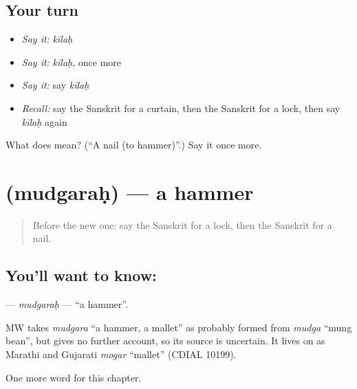 \subsection*{Your turn}
\begin{itemize}
\raggedright
  \item \emph{Say it:} \emph{kīlaḥ}
  \item \emph{Say it:} \emph{kīlaḥ}, once more
  \item \emph{Say it:} say \emph{kīlaḥ}
  \item \emph{Recall:} say the Sanskrit for a curtain, then the Sanskrit for a lock, then say \emph{kīlaḥ} again
\end{itemize}

\begin{tcolorbox}[breakable,colback=teal!4,colframe=teal!35!black,title={Before you move on}]
What does  mean? (\textquotedblleft{}A nail (to hammer)\textquotedblright{}.) Say it once more.
\end{tcolorbox}
\section[\texorpdfstring{\sk{मुद्गरः} (mudgaraḥ)}{मुद्गरः (mudgaraḥ)}]{ (mudgaraḥ) — a hammer}

\label{lesson:SA-C100-mudgarah}



\begin{quote}
Before the new one: say the Sanskrit for a lock, then the Sanskrit for a nail.
\end{quote}

\subsection*{You'll want to know: }
\textbf{} — \emph{mudgaraḥ} — \textquotedblleft{}a hammer\textquotedblright{}.

\begin{cousinweb}
MW takes \emph{mudgara} \textquotedblleft{}a hammer, a mallet\textquotedblright{} as probably formed from \emph{mudga} \textquotedblleft{}mung bean\textquotedblright{}, but gives no further account, so its source is uncertain. It lives on as Marathi and Gujarati \emph{mogar} \textquotedblleft{}mallet\textquotedblright{} (CDIAL 10199).
\end{cousinweb}

\begin{grammarlens}[title={What you've built}]
One more word for this chapter.
\end{grammarlens}

